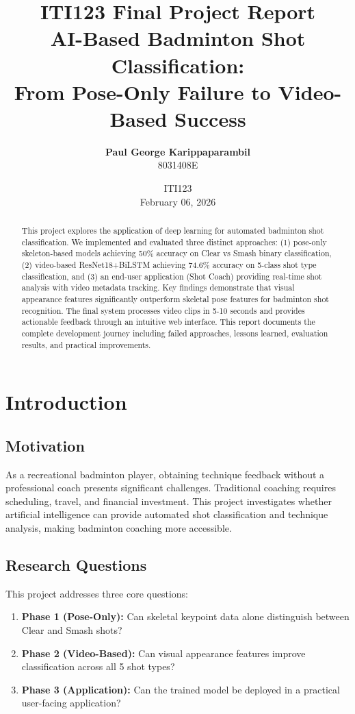 \documentclass[12pt,a4paper]{article}
\title{\textbf{ITI123 Final Project Report}\\\vspace{0.3cm}AI-Based Badminton Shot Classification:\\From Pose-Only Failure to Video-Based Success}
\author{\textbf{Paul George Karippaparambil}\\8031408E}
\date{ITI123\\February 06, 2026}
\begin{document}
\maketitle
\thispagestyle{empty}

\begin{abstract}
This project explores the application of deep learning for automated badminton shot classification. We implemented and evaluated three distinct approaches: (1) pose-only skeleton-based models achieving 50\% accuracy on Clear vs Smash binary classification, (2) video-based ResNet18+BiLSTM achieving 74.6\% accuracy on 5-class shot type classification, and (3) an end-user application (Shot Coach) providing real-time shot analysis with video metadata tracking. Key findings demonstrate that visual appearance features significantly outperform skeletal pose features for badminton shot recognition. The final system processes video clips in 5-10 seconds and provides actionable feedback through an intuitive web interface. This report documents the complete development journey including failed approaches, lessons learned, evaluation results, and practical improvements.
\end{abstract}

\newpage
\tableofcontents
\newpage

\section{Introduction}

\subsection{Motivation}

As a recreational badminton player, obtaining technique feedback without a professional coach presents significant challenges. Traditional coaching requires scheduling, travel, and financial investment. This project investigates whether artificial intelligence can provide automated shot classification and technique analysis, making badminton coaching more accessible.

\subsection{Research Questions}

This project addresses three core questions:

\begin{enumerate}
\item \textbf{Phase 1 (Pose-Only):} Can skeletal keypoint data alone distinguish between Clear and Smash shots?
\item \textbf{Phase 2 (Video-Based):} Can visual appearance features improve classification across all 5 shot types?
\item \textbf{Phase 3 (Application):} Can the trained model be deployed in a practical user-facing application?
\end{enumerate}
\end{document}
